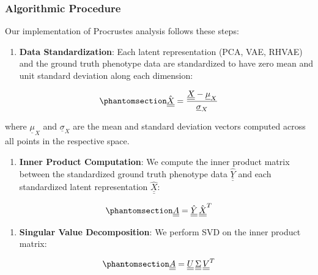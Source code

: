 \documentclass[
]{scrartcl}
\providecommand{\tightlist}{%
  \setlength{\itemsep}{0pt}\setlength{\parskip}{0pt}}\usepackage{longtable,booktabs,array}
\begin{document}
\begin{refsection}
\subsubsection{Algorithmic Procedure}\label{algorithmic-procedure}

Our implementation of Procrustes analysis follows these steps:

\begin{enumerate}
\def\labelenumi{\arabic{enumi}.}
\tightlist
\item
  \textbf{Data Standardization}: Each latent representation (PCA, VAE,
  RHVAE) and the ground truth phenotype data are standardized to have
  zero mean and unit standard deviation along each dimension:
\end{enumerate}

\begin{equation}\phantomsection\label{eq-standardization}{
\hat{\underline{\underline{X}}} = 
\frac{
    \underline{\underline{X}} -
    \underline{\mu}_X
}{
    \underline{\sigma}_X
}
}\end{equation}

where \(\underline{\mu}_X\) and \(\underline{\sigma}_X\) are the mean
and standard deviation vectors computed across all points in the
respective space.

\begin{enumerate}
\def\labelenumi{\arabic{enumi}.}
\setcounter{enumi}{1}
\tightlist
\item
  \textbf{Inner Product Computation}: We compute the inner product
  matrix between the standardized ground truth phenotype data
  \(\hat{\underline{\underline{Y}}}\) and each standardized latent
  representation \(\hat{\underline{\underline{X}}}\):
\end{enumerate}

\begin{equation}\phantomsection\label{eq-inner-product}{
\underline{\underline{A}} = 
\hat{\underline{\underline{Y}}}\,
\hat{\underline{\underline{X}}}^T
}\end{equation}

\begin{enumerate}
\def\labelenumi{\arabic{enumi}.}
\setcounter{enumi}{2}
\tightlist
\item
  \textbf{Singular Value Decomposition}: We perform SVD on the inner
  product matrix:
\end{enumerate}

\begin{equation}\phantomsection\label{eq-svd}{
\underline{\underline{A}} = 
\underline{\underline{U}}\,
\underline{\underline{\Sigma}}\,
\underline{\underline{V}}^T
}\end{equation}


\end{refsection}
\end{document}
